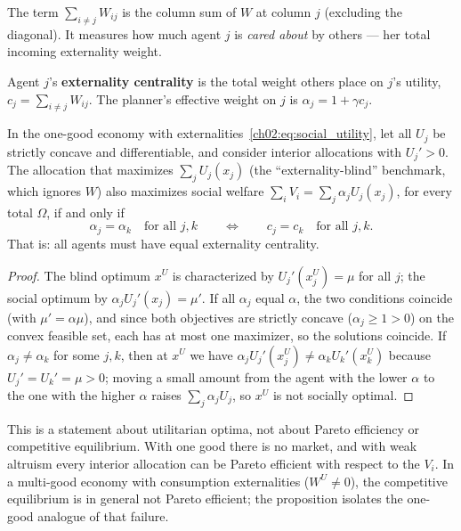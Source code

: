 \documentclass[../structural_economics_book.tex]{subfiles}
\begin{document}
The term $\sum_{i \neq j} W_{ij}$ is the column sum of $W$ at column $j$ (excluding the diagonal). It measures how much agent $j$ is \textit{cared about} by others --- her total incoming externality weight.

\begin{definition}\label{ch02:def:ext_centrality}
Agent $j$'s \textbf{externality centrality} is the total weight others place on $j$'s utility, $c_j = \sum_{i \neq j} W_{ij}$. The planner's effective weight on $j$ is $\alpha_j = 1 + \gamma c_j$.
\end{definition}

\begin{proposition}\label{ch02:thm:FWT_matrix}
In the one-good economy with externalities~\eqref{ch02:eq:social_utility}, let all $U_j$ be strictly concave and differentiable, and consider interior allocations with $U_j' > 0$. The allocation that maximizes $\sum_j U_j(x_j)$ (the ``externality-blind'' benchmark, which ignores $W$) also maximizes social welfare $\sum_i V_i = \sum_j \alpha_j U_j(x_j)$, for every total $\Omega$, if and only if
\begin{equation}\label{ch02:eq:FWT_condition}
\alpha_j = \alpha_k \quad \text{for all } j, k \qquad \Longleftrightarrow \qquad c_j = c_k \quad \text{for all } j, k.
\end{equation}
That is: all agents must have equal externality centrality.
\end{proposition}

\begin{proof}
The blind optimum $x^U$ is characterized by $U_j'(x^U_j) = \mu$ for all $j$; the social optimum by $\alpha_j U_j'(x_j) = \mu'$. If all $\alpha_j$ equal $\alpha$, the two conditions coincide (with $\mu' = \alpha\mu$), and since both objectives are strictly concave ($\alpha_j \ge 1 > 0$) on the convex feasible set, each has at most one maximizer, so the solutions coincide. If $\alpha_j \neq \alpha_k$ for some $j, k$, then at $x^U$ we have $\alpha_j U_j'(x^U_j) \neq \alpha_k U_k'(x^U_k)$ because $U_j' = U_k' = \mu > 0$; moving a small amount from the agent with the lower $\alpha$ to the one with the higher $\alpha$ raises $\sum_j \alpha_j U_j$, so $x^U$ is not socially optimal.
\end{proof}

\begin{remark}
This is a statement about utilitarian optima, not about Pareto efficiency or competitive equilibrium. With one good there is no market, and with weak altruism every interior allocation can be Pareto efficient with respect to the $V_i$. In a multi-good economy with consumption externalities ($W^U \neq 0$), the competitive equilibrium is in general not Pareto efficient; the proposition isolates the one-good analogue of that failure.
\end{remark}
\end{document}

